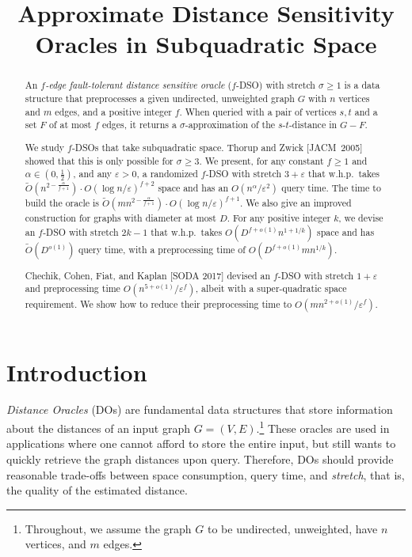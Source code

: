 \documentclass{theoretics}
\title{Approximate Distance Sensitivity Oracles in Subquadratic Space}
\renewcommand{\ge}{\geqslant}
\begin{document}
\maketitle

\begin{abstract}
	An \emph{\(f\)-edge fault-tolerant distance sensitive oracle} (\(f\)-DSO) with stretch \(\sigma \ge 1\)
	is a data structure that preprocesses a given undirected, unweighted graph \(G\) with \(n\) vertices and \(m\) edges, 
	and a positive integer \(f\).
	When queried with a pair of vertices \(s, t\) and a set \(F\) of at most \(f\) edges,
	it returns a \(\sigma\)-approximation of the \(s\)-\(t\)-distance in \(G-F\).

	We study \(f\)-DSOs that take subquadratic space.
	Thorup and Zwick [JACM~2005] showed that this is only possible for \(\sigma \ge 3\).
	We present, for any constant \(f \ge 1\) and \(\alpha \in (0, \frac{1}{2})\), 
	and any \(\varepsilon  > 0\), 
	a randomized \mbox{\(f\)-DSO} with stretch \( 3 + \varepsilon\)
	that w.h.p.\ takes 
	\(\widetilde{O}(n^{2-\frac{\alpha}{f+1}}) \cdot O(\log n/\varepsilon)^{f+2}\)
	space and has an \(O(n^\alpha/\varepsilon^2)\) query time.
	The time to build the oracle is \(\widetilde{O}(mn^{2-\frac{\alpha}{f+1}}) \cdot O(\log n/\varepsilon)^{f+1}\).
	We also give an improved construction for graphs with diameter at most \(D\).
	For any positive integer \(k\), we devise an \(f\)-DSO with stretch \(2k-1\) that w.h.p.\ takes
	\(O(D^{f+o(1)} n^{1+1/k})\) space and has \(\widetilde{O}(D^{o(1)})\) query time,
	with a preprocessing time of \(O(D^{f+o(1)} mn^{1/k})\).
  
	Chechik, Cohen, Fiat, and Kaplan [SODA 2017] devised an \(f\)-DSO with stretch \(1{+}\varepsilon\) 
	and preprocessing time $O(n^{5+o(1)}/\varepsilon^f)$, 
	albeit with a super-quadratic space requirement.
	We show how to reduce their preprocessing time to $O(mn^{2+o(1)}/\varepsilon^f)$.
\end{abstract}


\section{Introduction}
\label{sec:intro}

\emph{Distance Oracles} (DOs) are fundamental data structures 
that store information about the distances of an input graph $G=(V,E)$.\footnote{%
	Throughout, we assume the graph $G$ to be undirected, unweighted, have $n$ vertices,
	and $m$ edges.
}
These oracles are used in applications where one cannot afford to store the entire input,
but still wants to quickly retrieve the graph distances upon query.
Therefore, DOs should provide reasonable  trade-offs between space consumption, query time,
and \emph{stretch}, that is, the quality of the estimated distance. 
\end{document}
